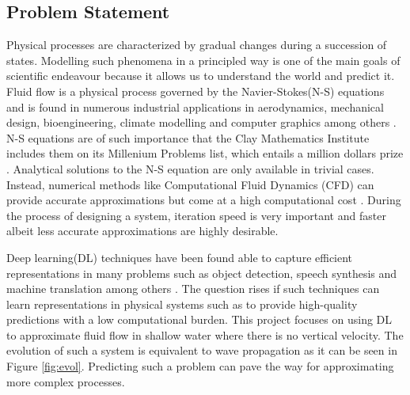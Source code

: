 \documentclass[a4paper,11pt]{article}
\begin{document}
\subsection{Problem Statement}
Physical processes are characterized by gradual changes during a succession of states. Modelling such phenomena in a principled way is one of the main goals of scientific endeavour because it allows us to understand the world and predict it. Fluid flow is a physical process governed by the Navier-Stokes(N-S) equations and is found in numerous industrial applications in aerodynamics, mechanical design, bioengineering, climate modelling and computer graphics among others \cite{thuerey2018well}. N-S equations are of such importance that the Clay Mathematics Institute includes them on its Millenium Problems list, which entails a million dollars prize \cite{clay}. Analytical solutions to the N-S equation are only available in trivial cases. Instead, numerical methods like Computational Fluid Dynamics (CFD) can provide accurate approximations but come at a high computational cost \cite{ferziger2012computationalcfd}. During the process of designing a system, iteration speed is very important and faster albeit less accurate approximations are highly desirable. 

Deep learning(DL) techniques have been found able to capture efficient representations in many problems such as object detection, speech synthesis and machine translation among others \cite{lecun2015deep}. The question rises if such techniques can learn representations in physical systems such as to provide high-quality predictions with a low computational burden. This project focuses on using DL to approximate fluid flow in shallow water where there is no vertical velocity. The evolution of such a system is equivalent to wave propagation as it can be seen in Figure \ref{fig:evol}. Predicting such a problem can pave the way for approximating more complex processes. 


\end{document}
